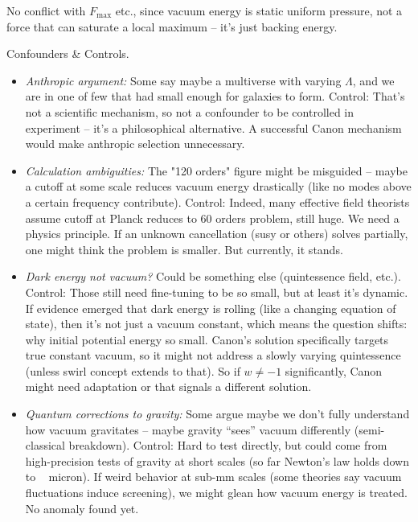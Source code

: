 \documentclass[11pt]{article}
\begin{document}
No conflict with $F_{\max}$ etc., since vacuum energy is static uniform pressure, not a force that can saturate a local maximum – it’s just backing energy.


Confounders & Controls.


\begin{itemize}

\item 
\textit{Anthropic argument:} Some say maybe a multiverse with varying $\Lambda$, and we are in one of few that had small enough for galaxies to form. Control: That’s not a scientific mechanism, so not a confounder to be controlled in experiment – it’s a philosophical alternative. A successful Canon mechanism would make anthropic selection unnecessary.




\item 
\textit{Calculation ambiguities:} The "120 orders" figure might be misguided – maybe a cutoff at some scale reduces vacuum energy drastically (like no modes above a certain frequency contribute). Control: Indeed, many effective field theorists assume cutoff at Planck reduces to 60 orders problem, still huge. We need a physics principle. If an unknown cancellation (susy or others) solves partially, one might think the problem is smaller. But currently, it stands.




\item 
\textit{Dark energy not vacuum?} Could be something else (quintessence field, etc.). Control: Those still need fine-tuning to be so small, but at least it’s dynamic. If evidence emerged that dark energy is rolling (like a changing equation of state), then it’s not just a vacuum constant, which means the question shifts: why initial potential energy so small. Canon’s solution specifically targets true constant vacuum, so it might not address a slowly varying quintessence (unless swirl concept extends to that). So if $w\neq -1$ significantly, Canon might need adaptation or that signals a different solution.




\item 
\textit{Quantum corrections to gravity:} Some argue maybe we don’t fully understand how vacuum gravitates – maybe gravity “sees” vacuum differently (semi-classical breakdown). Control: Hard to test directly, but could come from high-precision tests of gravity at short scales (so far Newton’s law holds down to ~ micron). If weird behavior at sub-mm scales (some theories say vacuum fluctuations induce screening), we might glean how vacuum energy is treated. No anomaly found yet.





\end{itemize}
\end{document}
